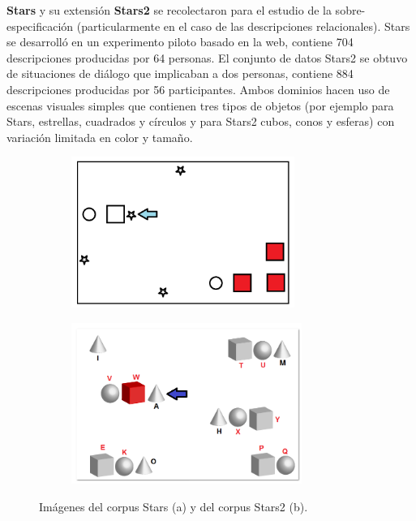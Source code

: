 {\bf Stars} y su extensi\'on {\bf Stars2} \cite{Paraboni2016} se recolectaron para el estudio de la sobre-especificaci\'on (particularmente en el caso de las descripciones relacionales). Stars se desarroll\'o en un experimento piloto basado en la web, contiene 704 descripciones producidas por 64 personas. El conjunto de datos Stars2 se obtuvo de situaciones de di\'alogo que implicaban a dos personas, contiene 884 descripciones producidas por 56 participantes. Ambos dominios hacen uso de escenas visuales simples que contienen tres tipos de objetos (por ejemplo para Stars, estrellas, cuadrados y c\'irculos y para Stars2 cubos, conos y esferas) con variaci\'on limitada en color y tama\~no. 

\begin{figure}[H]
\begin{subfigure}{.5\textwidth}
\centering
\includegraphics[width=\textwidth]{images/STARS.png}\\[0pt]
\caption{}
\label{fig-STARS}
\end{subfigure}
\hspace*{0cm}
\begin{subfigure}{.5\textwidth}

\centering
\includegraphics[width=\textwidth]{images/STARS2.png}\\[0pt]
\caption{}
\label{fig-STARS2}
\end{subfigure}
\caption{Im\'agenes del corpus Stars (a) y del corpus Stars2 (b).}\label{imagenes-stars-stars2}
\end{figure}

